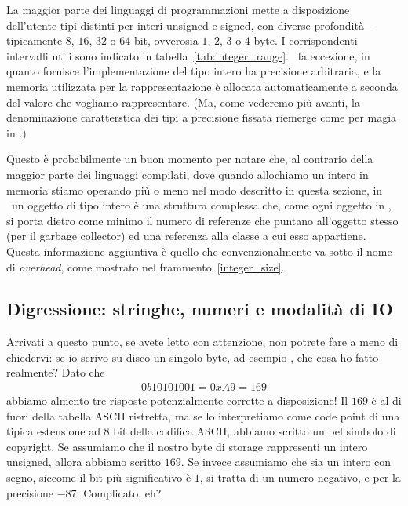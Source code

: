 La maggior parte dei linguaggi di programmazioni mette a disposizione dell'utente
tipi distinti per interi unsigned e signed, con diverse profondit\`a---tipicamente
$8$, $16$, $32$ o $64$ bit, ovverosia $1$, $2$, $3$ o $4$ byte. I corrispondenti
intervalli utili sono indicato in tabella~\ref{tab:integer_range}.
\python\ fa eccezione, in quanto fornisce l'implementazione del tipo intero ha precisione
arbitraria, e la memoria utilizzata per la rappresentazione \`e allocata automaticamente
a seconda del valore che vogliamo rappresentare. (Ma, come vederemo pi\`u avanti,
la denominazione caratterstica dei tipi a precisione fissata riemerge come per magia
in \numpy.)

Questo \`e probabilmente un buon momento per notare che, al contrario della maggior
parte dei linguaggi compilati, dove quando allochiamo un intero in memoria stiamo
operando pi\`u o meno nel modo descritto in questa sezione, in \python\ un oggetto
di tipo intero \`e una struttura complessa che, come ogni oggetto in \python, si
porta dietro come minimo il numero di referenze che puntano all'oggetto stesso
(per il garbage collector) ed una referenza alla classe a cui esso appartiene.
Questa informazione aggiuntiva \`e quello che convenzionalmente va sotto il nome di
\emph{overhead}, come mostrato nel frammento~\ref{integer_size}.



\subsection{Digressione: stringhe, numeri e modalit\`a di IO}

Arrivati a questo punto, se avete letto con attenzione, non potrete fare a meno di
chiedervi: se io scrivo su disco un singolo byte, ad esempio ,
che cosa ho fatto realmente? Dato che
\begin{align*}
  0b10101001 = 0xA9 = 169
\end{align*}
abbiamo almento tre risposte potenzialmente corrette a disposizione! Il $169$ \`e
al di fuori della tabella ASCII ristretta, ma se lo interpretiamo come code point
di una tipica estensione ad $8$ bit della codifica ASCII, abbiamo scritto un bel
simbolo di copyright. Se assumiamo che il nostro byte di storage rappresenti un
intero unsigned, allora abbiamo scritto $169$. Se invece assumiamo che sia un intero
con segno, siccome il bit pi\`u significativo \`e $1$, si tratta di un numero negativo,
e per la precisione $-87$. Complicato, eh?

